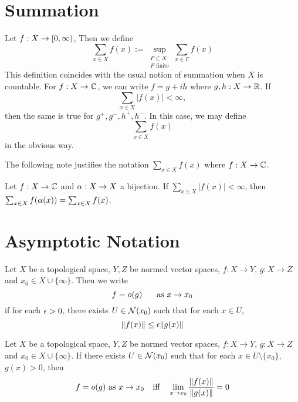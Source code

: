 \documentclass{book}
\begin{document}
 
 
 
 
 
 \appendix
 
 \chapter{Summation}
 
 \begin{defn} \ld{}
 	Let $f:X \rightarrow [0,\infty)$, Then we define $$\sum_{x \in X} f(x) := \sup_{\substack{F \subset X \\ F \text{ finite}}} \sum_{x \in F} f(x)$$ This definition coincides with the usual notion of summation when $X$ is countable. For $f:X \rightarrow \mathbb{C}$, we can write $f = g +ih$ where $g,h:X \rightarrow \mathbb{R}$. If $$\sum_{x \in X}|f(x)| < \infty,$$ then the same is true for $g^+,g^-,h^+,h^-$. In this case, we may define $$\sum_{x \in X} f(x)$$ in the obvious way.
 \end{defn} 
 
 The following note justifies the notation $\sum_{x \in X}f(x)$ where $f:X \rightarrow \mathbb{C}$.
 
 \begin{note}
 	Let $f:X \rightarrow \mathbb{C}$ and $\alpha:X \rightarrow X$ a bijection. If $\sum_{x \in X}|f(x)|< \infty$, then $\sum_{x \in X}f( \alpha (x)) = \sum_{x \in X}f(x) $.
 \end{note}
 
 \newpage	
 
 \chapter{Asymptotic Notation}
 
 \begin{defn} \ld{}
 	Let $X$ be a topological space, $Y, Z$ be normed vector spaces, $f:X \rightarrow Y$, $g: X \rightarrow Z$ and $x_0 \in X \cup \{\infty\}$. Then we write $$f = o(g) \hspace{.5cm} \text{ as } x \rightarrow x_0$$ if for each $\epsilon >0$, there exists $U \in \mathcal{N}(x_0)$ such that for each $x \in U$, $$\|f(x)\| \leq \epsilon\|g(x)\|$$
 \end{defn}
 
 \begin{ex} \lex{}
 	Let $X$ be a topological space, $Y, Z$ be normed vector spaces, $f:X \rightarrow Y$, $g: X \rightarrow Z$ and $x_0 \in X \cup \{\infty\}$. If there exists $U \in \mathcal{N}(x_0)$ such that for each $x \in U \setminus \{x_0\}$, $g(x) > 0$, then $$f = o(g) \text{ as } x \rightarrow x_0 \hspace{.25cm} \text{ iff } \hspace{.25cm}  \lim_{x \rightarrow x_0} \frac{\| f(x) \|}{\| g(x) \|} = 0$$
 \end{ex}	
 
\end{document}
